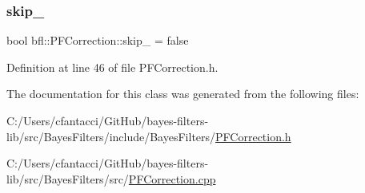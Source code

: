 \subsubsection{\texorpdfstring{skip\+\_\+}{skip\_}}
{\footnotesize\ttfamily bool bfl\+::\+P\+F\+Correction\+::skip\+\_\+ = false\hspace{0.3cm}{\ttfamily [private]}}



Definition at line 46 of file P\+F\+Correction.\+h.



The documentation for this class was generated from the following files\+:\begin{DoxyCompactItemize}
\item 
C\+:/\+Users/cfantacci/\+Git\+Hub/bayes-\/filters-\/lib/src/\+Bayes\+Filters/include/\+Bayes\+Filters/\mbox{\hyperlink{PFCorrection_8h}{P\+F\+Correction.\+h}}\item 
C\+:/\+Users/cfantacci/\+Git\+Hub/bayes-\/filters-\/lib/src/\+Bayes\+Filters/src/\mbox{\hyperlink{PFCorrection_8cpp}{P\+F\+Correction.\+cpp}}\end{DoxyCompactItemize}
